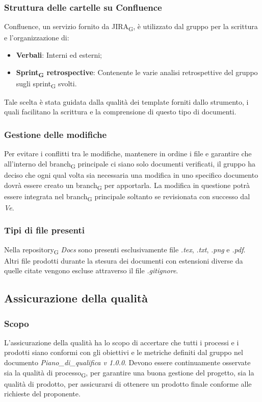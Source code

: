 \subsubsection{Struttura delle cartelle su Confluence}
Confluence, un servizio fornito da JIRA\textsubscript{G}, è utilizzato dal gruppo per la scrittura e l'organizzazione di:
\begin{itemize}
	\item \textbf{Verbali}: Interni ed esterni;
	\item \textbf{Sprint\textsubscript{G} retrospective}: Contenente le varie analisi retrospettive del gruppo sugli sprint\textsubscript{G} svolti.
\end{itemize}
Tale scelta è stata guidata dalla qualità dei template forniti dallo strumento, i quali facilitano la scrittura e la comprensione di questo tipo di documenti.

\subsubsection{Gestione delle modifiche}
Per evitare i conflitti tra le modifiche, mantenere in ordine i file e garantire che all'interno del branch\textsubscript{G} principale ci siano solo documenti verificati, il gruppo ha deciso che ogni qual volta sia necessaria una modifica in uno specifico documento dovrà essere creato un branch\textsubscript{G} per apportarla. La modifica in questione potrà essere integrata nel branch\textsubscript{G} principale soltanto se revisionata con successo dal \textit{Ve}.

\subsubsection{Tipi di file presenti}
Nella repository\textsubscript{G} \textit{Docs} sono presenti esclusivamente file \textit{.tex}, \textit{.txt}, \textit{.png} e \textit{.pdf}. Altri file prodotti durante la stesura dei documenti con estensioni diverse da quelle citate vengono escluse attraverso il file \textit{.gitignore}.



\subsection{Assicurazione della qualità}
\subsubsection{Scopo}
L'assicurazione della qualità ha lo scopo di accertare che tutti i processi e i prodotti siano conformi con gli obiettivi e le metriche definiti dal gruppo nel documento \textit{Piano\_di\_qualifica v 1.0.0}. 
Devono essere continuamente osservate sia la qualità di processo\textsubscript{G}, per garantire una buona gestione del progetto, sia la qualità di prodotto, per assicurarsi di ottenere un prodotto finale conforme alle richieste del proponente.
